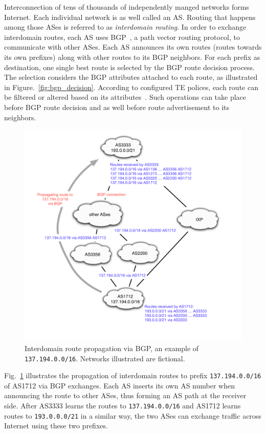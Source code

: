 Interconnection of tens of thousands of independently manged networks forms Internet.
Each individual network is as well called an \acf{AS}.
Routing that happens among those ASes is referred to as 
\textit{interdomain routing}.
In order to exchange interdomain routes, each AS uses \acf{BGP}~\cite{bgp4}, a path vector routing protocol, to communicate with other ASes.
Each AS announces its own routes (routes towards its own prefixes) along with other routes to its BGP neighbors.
For each prefix as destination, one single best route is selected by the BGP route decision process.
The selection considers the BGP attributes attached to each route, as illustrated in Figure.~\ref{fig:bgp_decision}.
According to configured TE polices, each route can be filtered or altered based on its attributes~\cite{Quoitin2003, Gao2001a}.
Such operations can take place before BGP route decision and as well before route advertisement to its neighbors.

\begin{figure}[!htb]
\centering
\includegraphics[width=1.1\textwidth]{gfx/chap1/bgp_route_propagation.pdf}
\caption{Interdomain route propagation via \ac{BGP}, an example of \texttt{137.194.0.0/16}. Networks illustrated are fictional.}
\label{fig:bgp_propa}
\end{figure}

Fig.~\ref{fig:bgp_propa} illustrates the propagation of interdomain routes to prefix \texttt{137.194.0.0/16} of AS1712 via BGP exchanges. Each AS inserts its own AS number when announcing the route to other ASes, thus forming an AS path at the receiver side. After AS3333 learns the routes to \texttt{137.194.0.0/16} and AS1712 learns routes to \texttt{193.0.0.0/21} in a similar way, the two ASes can exchange traffic across Internet using these two prefixes.

